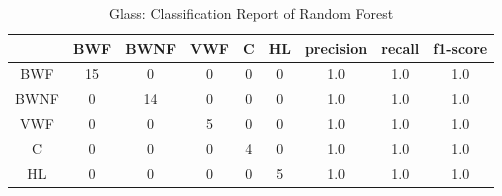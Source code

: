 \documentclass[english]{tktltiki2}
\theoremstyle{definition}
\theoremstyle{remark}
\begin{document}
\begin{table}[H]
	\begin{center}
		\caption{Glass: Classification Report of Random Forest}
		\label{table:rf_model_glass_report}
		\begin{tabular}{@{}ccccccccc@{}}
			\toprule
			&  BWF & BWNF & VWF & C & HL & precision & recall & f1-score \\ \hline
			\multicolumn{1}{|c|}{BWF} & \multicolumn{1}{c|}{15} & \multicolumn{1}{c|}{0} & \multicolumn{1}{c|}{0} & \multicolumn{1}{c|}{0} & \multicolumn{1}{c|}{0} & \multicolumn{1}{c|}{1.0} & \multicolumn{1}{c|}{1.0} & \multicolumn{1}{c|}{1.0} \\ \hline
			
			\multicolumn{1}{|c|}{BWNF} & \multicolumn{1}{c|}{0} & \multicolumn{1}{c|}{14} & \multicolumn{1}{c|}{0} & \multicolumn{1}{c|}{0} & \multicolumn{1}{c|}{0} & \multicolumn{1}{c|}{1.0} & \multicolumn{1}{c|}{1.0} & \multicolumn{1}{c|}{1.0} \\ \hline
			
			\multicolumn{1}{|c|}{VWF} & \multicolumn{1}{c|}{0} & \multicolumn{1}{c|}{0} & \multicolumn{1}{c|}{5} & \multicolumn{1}{c|}{0} & \multicolumn{1}{c|}{0} & \multicolumn{1}{c|}{1.0} & \multicolumn{1}{c|}{1.0} & \multicolumn{1}{c|}{1.0} \\ \hline
			
			\multicolumn{1}{|c|}{C} & \multicolumn{1}{c|}{0} & \multicolumn{1}{c|}{0} & \multicolumn{1}{c|}{0} & \multicolumn{1}{c|}{4} & \multicolumn{1}{c|}{0} & \multicolumn{1}{c|}{1.0} & \multicolumn{1}{c|}{1.0} & \multicolumn{1}{c|}{1.0} \\ \hline
			
			\multicolumn{1}{|c|}{HL} & \multicolumn{1}{c|}{0} & \multicolumn{1}{c|}{0} & \multicolumn{1}{c|}{0} & \multicolumn{1}{c|}{0} & \multicolumn{1}{c|}{5} & \multicolumn{1}{c|}{1.0} & \multicolumn{1}{c|}{1.0} & \multicolumn{1}{c|}{1.0} \\ \hline
		\end{tabular}
	\end{center}
\end{table}
\end{document}
